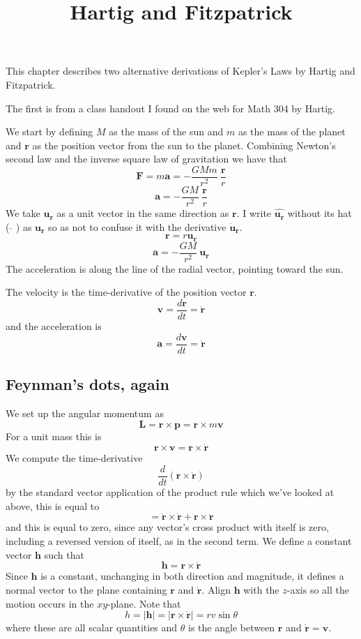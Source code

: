 \documentclass[11pt, oneside]{article}
\title{Hartig and Fitzpatrick}
\date{}
\begin{document}
\maketitle
\Large

This chapter describes two alternative derivations of Kepler's Laws by Hartig and Fitzpatrick. 

The first is from a class handout I found on the web for Math 304 by Hartig.

We start by defining $M$ as the mass of the sun and $m$ as the mass of the planet and $\mathbf{r}$ as the position vector from the sun to the planet.  Combining Newton's second law and the inverse square law of gravitation we have that
\[ \mathbf{F} = m \mathbf{a} = -\frac{GMm}{r^2} \ \frac{\mathbf{r}}{r}  \]
\[ \mathbf{a} = -\frac{GM}{r^2} \ \frac{\mathbf{r}}{r}  \]
We take $\mathbf{u_r}$ as a unit vector in the same direction as $\mathbf{r}$.  I write $\hat{\mathbf{u_r}}$ without its hat ( $\hat{}$ ) as $\mathbf{u_r}$ so as not to confuse it with the derivative $\dot{\mathbf{u}}_\mathbf{r}$.
\[ \mathbf{r} = r \mathbf{u_r} \]
\[ \mathbf{a} = -\frac{GM}{r^2} \ \mathbf{u_r}  \]
The acceleration is along the line of the radial vector, pointing toward the sun.


The velocity is the time-derivative of the position vector $\mathbf{r}$.
\[ \mathbf{v} = \frac{d\mathbf{r}}{dt} = \dot{\mathbf{r}} \]
and the acceleration is
\[ \mathbf{a} = \frac{d\mathbf{v}}{dt} = \ddot{\mathbf{r}} \]

\subsection*{Feynman's dots, again}
We set up the angular momentum as 
\[ \mathbf{L} = \mathbf{r} \times \mathbf{p}  =  \mathbf{r} \times m\mathbf{v}\]
For a unit mass this is
\[ \mathbf{r} \times \mathbf{v} =  \mathbf{r} \times \dot{\mathbf{r}} \]
We compute the time-derivative
\[ \frac{d}{dt} (\mathbf{r} \times \dot{\mathbf{r}}) \]
by the standard vector application of the product rule which we've looked at above, this is equal to 
\[ =  \dot{\mathbf{r}} \times \dot{\mathbf{r}} + \mathbf{r} \times \ddot{\mathbf{r}} \]
and this is equal to zero, since any vector's cross product with itself is zero, including a reversed version of itself, as in the second term.  We define a constant vector $\mathbf{h}$ such that
\[ \mathbf{h} = \mathbf{r} \times \dot{\mathbf{r}} \]
Since $\mathbf{h}$ is a constant, unchanging in both direction and magnitude, it defines a normal vector to the plane containing $\mathbf{r}$ and $\dot{\mathbf{r}}$.  Align $\mathbf{h}$ with the $z$-axis so all the motion occurs in the $xy$-plane.
Note that 
\[ h = |\mathbf{h}| = | \mathbf{r} \times \dot{\mathbf{r}} | = rv \sin \theta \]
where these are all scalar quantities and $\theta$ is the angle between $\mathbf{r}$ and $\dot{\mathbf{r}} = \mathbf{v}$.
\end{document}
